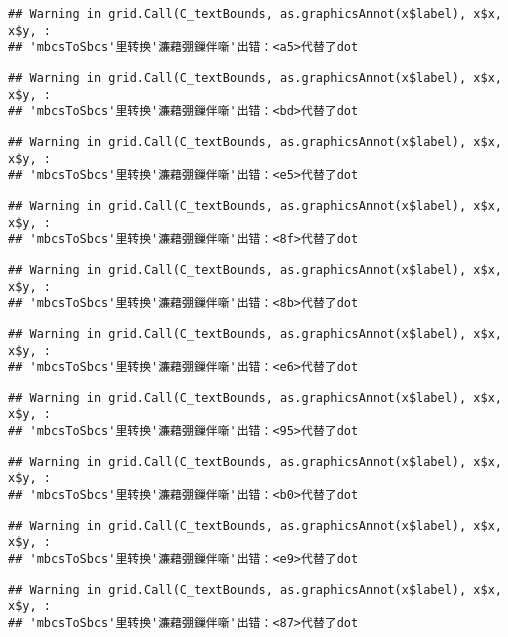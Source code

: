 \documentclass[]{article}
\begin{document}
\begin{verbatim}
## Warning in grid.Call(C_textBounds, as.graphicsAnnot(x$label), x$x, x$y, :
## 'mbcsToSbcs'里转换'濂藉弸鏁伴噺'出错：<a5>代替了dot
\end{verbatim}

\begin{verbatim}
## Warning in grid.Call(C_textBounds, as.graphicsAnnot(x$label), x$x, x$y, :
## 'mbcsToSbcs'里转换'濂藉弸鏁伴噺'出错：<bd>代替了dot
\end{verbatim}

\begin{verbatim}
## Warning in grid.Call(C_textBounds, as.graphicsAnnot(x$label), x$x, x$y, :
## 'mbcsToSbcs'里转换'濂藉弸鏁伴噺'出错：<e5>代替了dot
\end{verbatim}

\begin{verbatim}
## Warning in grid.Call(C_textBounds, as.graphicsAnnot(x$label), x$x, x$y, :
## 'mbcsToSbcs'里转换'濂藉弸鏁伴噺'出错：<8f>代替了dot
\end{verbatim}

\begin{verbatim}
## Warning in grid.Call(C_textBounds, as.graphicsAnnot(x$label), x$x, x$y, :
## 'mbcsToSbcs'里转换'濂藉弸鏁伴噺'出错：<8b>代替了dot
\end{verbatim}

\begin{verbatim}
## Warning in grid.Call(C_textBounds, as.graphicsAnnot(x$label), x$x, x$y, :
## 'mbcsToSbcs'里转换'濂藉弸鏁伴噺'出错：<e6>代替了dot
\end{verbatim}

\begin{verbatim}
## Warning in grid.Call(C_textBounds, as.graphicsAnnot(x$label), x$x, x$y, :
## 'mbcsToSbcs'里转换'濂藉弸鏁伴噺'出错：<95>代替了dot
\end{verbatim}

\begin{verbatim}
## Warning in grid.Call(C_textBounds, as.graphicsAnnot(x$label), x$x, x$y, :
## 'mbcsToSbcs'里转换'濂藉弸鏁伴噺'出错：<b0>代替了dot
\end{verbatim}

\begin{verbatim}
## Warning in grid.Call(C_textBounds, as.graphicsAnnot(x$label), x$x, x$y, :
## 'mbcsToSbcs'里转换'濂藉弸鏁伴噺'出错：<e9>代替了dot
\end{verbatim}

\begin{verbatim}
## Warning in grid.Call(C_textBounds, as.graphicsAnnot(x$label), x$x, x$y, :
## 'mbcsToSbcs'里转换'濂藉弸鏁伴噺'出错：<87>代替了dot
\end{verbatim}
\end{document}
